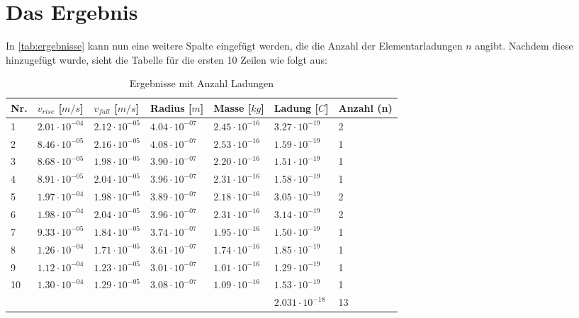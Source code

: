 \section{Das Ergebnis}\label{sec:ergebnis}
In \autoref{tab:ergebnisse} kann nun eine weitere Spalte eingefügt werden, die die Anzahl der Elementarladungen $n$ angibt. Nachdem diese hinzugefügt wurde, sieht die Tabelle für die ersten 10 Zeilen wie folgt aus:

\begin{table}[H]
	\centering
	\begin{tabular}{llllll|l}
		\toprule
		Nr. & $v_{rise}$ [$m/s$] & $v_{fall}$ [$m/s$] & Radius [$m$] & Masse [$kg$]  & Ladung [$C$]& Anzahl (n) \\
		\midrule
		1 &$\mathrm{2.01 \cdot 10^{-04}}$ & $\mathrm{2.12 \cdot 10^{-05}}$ & $\mathrm{4.04 \cdot 10^{-07}}$ & $\mathrm{2.45 \cdot 10^{-16}}$ & $\mathrm{3.27 \cdot 10^{-19}}$ & 2\\
		2 &$\mathrm{8.46 \cdot 10^{-05}}$ & $\mathrm{2.16 \cdot 10^{-05}}$ & $\mathrm{4.08 \cdot 10^{-07}}$ & $\mathrm{2.53 \cdot 10^{-16}}$ & $\mathrm{1.59 \cdot 10^{-19}}$ & 1\\
		3 &$\mathrm{8.68 \cdot 10^{-05}}$ & $\mathrm{1.98 \cdot 10^{-05}}$ & $\mathrm{3.90 \cdot 10^{-07}}$ & $\mathrm{2.20 \cdot 10^{-16}}$ & $\mathrm{1.51 \cdot 10^{-19}}$ & 1\\
		4 &$\mathrm{8.91 \cdot 10^{-05}}$ & $\mathrm{2.04 \cdot 10^{-05}}$ & $\mathrm{3.96 \cdot 10^{-07}}$ & $\mathrm{2.31 \cdot 10^{-16}}$ & $\mathrm{1.58 \cdot 10^{-19}}$ & 1\\
		5 &$\mathrm{1.97 \cdot 10^{-04}}$ & $\mathrm{1.98 \cdot 10^{-05}}$ & $\mathrm{3.89 \cdot 10^{-07}}$ & $\mathrm{2.18 \cdot 10^{-16}}$ & $\mathrm{3.05 \cdot 10^{-19}}$ & 2\\
		6 &$\mathrm{1.98 \cdot 10^{-04}}$ & $\mathrm{2.04 \cdot 10^{-05}}$ & $\mathrm{3.96 \cdot 10^{-07}}$ & $\mathrm{2.31 \cdot 10^{-16}}$ & $\mathrm{3.14 \cdot 10^{-19}}$ & 2\\
		7 &$\mathrm{9.33 \cdot 10^{-05}}$ & $\mathrm{1.84 \cdot 10^{-05}}$ & $\mathrm{3.74 \cdot 10^{-07}}$ & $\mathrm{1.95 \cdot 10^{-16}}$ & $\mathrm{1.50 \cdot 10^{-19}}$ & 1\\
		8 &$\mathrm{1.26 \cdot 10^{-04}}$ & $\mathrm{1.71 \cdot 10^{-05}}$ & $\mathrm{3.61 \cdot 10^{-07}}$ & $\mathrm{1.74 \cdot 10^{-16}}$ & $\mathrm{1.85 \cdot 10^{-19}}$ & 1\\
		9 &$\mathrm{1.12 \cdot 10^{-04}}$ & $\mathrm{1.23 \cdot 10^{-05}}$ & $\mathrm{3.01 \cdot 10^{-07}}$ & $\mathrm{1.01 \cdot 10^{-16}}$ & $\mathrm{1.29 \cdot 10^{-19}}$ & 1\\
		10 &$\mathrm{1.30 \cdot 10^{-04}}$ & $\mathrm{1.29 \cdot 10^{-05}}$ & $\mathrm{3.08 \cdot 10^{-07}}$ & $\mathrm{1.09 \cdot 10^{-16}}$ & $\mathrm{1.53 \cdot 10^{-19}}$ & 1\\
		\bottomrule
		&&&&& $2.031 \cdot 10^{-18}$ & 13 \\
	\end{tabular}
	\caption{Ergebnisse mit Anzahl Ladungen}
	\label{tab:anzahlLadung}
\end{table}
